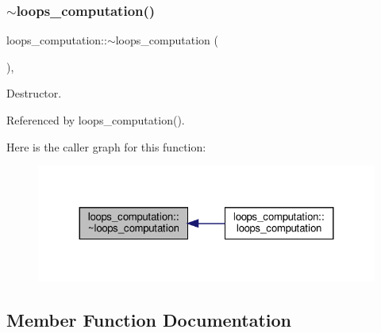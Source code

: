 \subsubsection{\texorpdfstring{$\sim$loops\+\_\+computation()}{~loops\_computation()}}
{\footnotesize\ttfamily loops\+\_\+computation\+::$\sim$loops\+\_\+computation (\begin{DoxyParamCaption}{ }\end{DoxyParamCaption})\hspace{0.3cm}{\ttfamily [override]}, {\ttfamily [default]}}



Destructor. 



Referenced by loops\+\_\+computation().

Here is the caller graph for this function\+:
\nopagebreak
\begin{figure}[H]
\begin{center}
\leavevmode
\includegraphics[width=324pt]{d1/d00/classloops__computation_a98efcffcabc94e5f8d03fceeb6b6bf92_icgraph}
\end{center}
\end{figure}


\subsection{Member Function Documentation}
\mbox{\label{classloops__computation_a37f11647b0d66f1f4df2354ef2bbaa0f}} 
